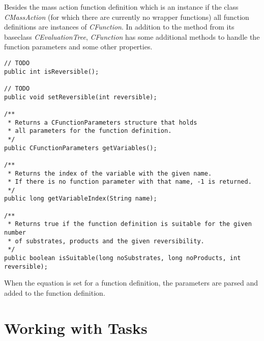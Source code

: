 \documentclass[a4,12pt]{article}
\begin{document}
Besides the mass action function definition which is an instance if the class \textit{CMassAction} (for which there are currently no wrapper functions) all function definitions are instances of \textit{CFunction}. In addition to the method from its baseclass \textit{CEvaluationTree}, \textit{CFunction} has some additional methods to handle the function parameters and some other properties.

\begin{lstlisting}
// TODO
public int isReversible();

// TODO
public void setReversible(int reversible);

/**
 * Returns a CFunctionParameters structure that holds
 * all parameters for the function definition.
 */
public CFunctionParameters getVariables();

/**
 * Returns the index of the variable with the given name.
 * If there is no function parameter with that name, -1 is returned.
 */
public long getVariableIndex(String name);

/**
 * Returns true if the function definition is suitable for the given number
 * of substrates, products and the given reversibility.
 */
public boolean isSuitable(long noSubstrates, long noProducts, int reversible);
\end{lstlisting}

When the equation is set for a function definition, the parameters are parsed and added to the function definition.


\section{Working with Tasks}
\end{document}
